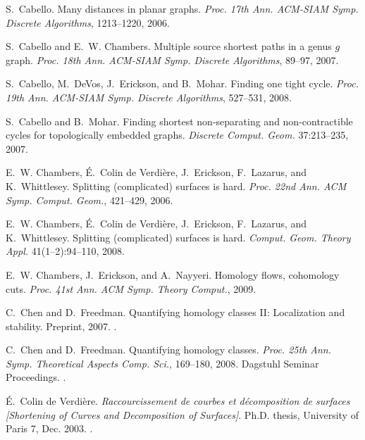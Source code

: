 \documentclass{sig-alternate}
\begin{document}
\begin{thebibliography}{10}
S.~Cabello.
\newblock Many distances in planar graphs.
\newblock \emph{Proc. 17th Ann. ACM-SIAM Symp. Discrete Algorithms},
  1213--1220, 2006.

S.~Cabello and E.~W. Chambers.
\newblock Multiple source shortest paths in a genus $g$ graph.
\newblock \emph{Proc. 18th Ann. ACM-SIAM Symp. Discrete Algorithms}, 89--97,
  2007.

S.~Cabello, M.~DeVos, J.~Erickson, and B.~Mohar.
\newblock Finding one tight cycle.
\newblock \emph{Proc. 19th Ann. ACM-SIAM Symp. Discrete Algorithms}, 527--531,
  2008.

S.~Cabello and B.~Mohar.
\newblock Finding shortest non-separating and non-contractible cycles for
  topologically embedded graphs.
\newblock \emph{Discrete Comput. Geom.} 37:213--235, 2007.

E.~W. Chambers, {\'E}.~{Colin de Verdi\`{e}re}, J.~Erickson, F.~Lazarus, and
  K.~Whittlesey.
\newblock Splitting (complicated) surfaces is hard.
\newblock \emph{Proc. 22nd Ann. ACM Symp. Comput. Geom.}, 421--429, 2006.

E.~W. Chambers, {\'E}.~{Colin de Verdi{\`e}re}, J.~Erickson, F.~Lazarus, and
  K.~Whittlesey.
\newblock Splitting (complicated) surfaces is hard.
\newblock \emph{Comput. Geom. Theory Appl.} 41(1--2):94--110, 2008.

E.~W. Chambers, J.~Erickson, and A.~Nayyeri.
\newblock Homology flows, cohomology cuts.
\newblock \emph{Proc. 41st Ann. ACM Symp. Theory Comput.}, 2009.

C.~Chen and D.~Freedman.
\newblock Quantifying homology classes {II}: {L}ocalization and stability.
\newblock Preprint, 2007.
\newblock {}.

C.~Chen and D.~Freedman.
\newblock Quantifying homology classes.
\newblock \emph{Proc. 25th Ann. Symp. Theoretical Aspects Comp. Sci.},
  169--180, 2008. Dagstuhl Seminar Proceedings.
\newblock {}.

{\'E}.~{Colin de Verdi{\`e}re}.
\newblock \emph{Raccourcissement de courbes et d{\'e}composition de surfaces
  [Shortening of Curves and Decomposition of Surfaces]}.
\newblock Ph.D. thesis, University of Paris 7, Dec. 2003.
\newblock {}.


\end{thebibliography}
\end{document}
